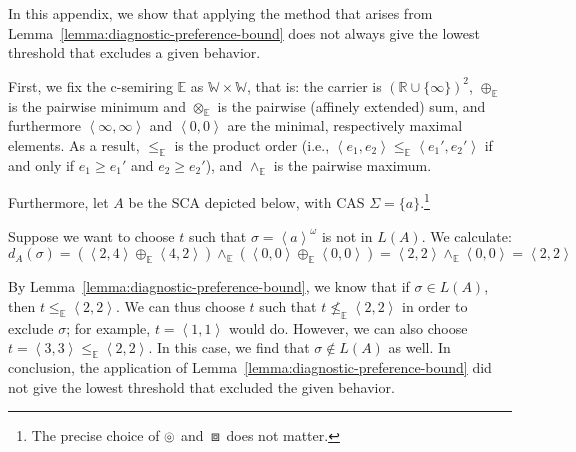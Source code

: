 \documentclass[a4paper]{article}
\newcommand{\angl}[1]{\left\langle#1\right\rangle}
\newcommand{\abscsemiring}{\mathbb{E}}
\newcommand{\wcsemiring}{\mathbb{W}}
\newcommand{\composable}{\mathop{\ocircle}\nolimits}
\newcommand{\compose}{\mathop{\boxbox}\nolimits}
\theoremstyle{definition}
\begin{document}
\begin{appendix}
In this appendix, we show that applying the method that arises from Lemma~\ref{lemma:diagnostic-preference-bound} does not always give the lowest threshold that excludes a given behavior.

First, we fix the c-semiring $\abscsemiring$ as $\wcsemiring \times \wcsemiring$, that is: the carrier is ${(\mathbb{R} \cup \{ \infty \})}^2$, $\oplus_\abscsemiring$ is the pairwise minimum and $\otimes_\abscsemiring$ is the pairwise (affinely extended) sum, and furthermore $\angl{\infty, \infty}$ and $\angl{0, 0}$ are the minimal, respectively maximal elements. As a result, $\leq_\abscsemiring$ is the product order (i.e., $\angl{e_1, e_2} \leq_\abscsemiring \angl{e_1', e_2'}$ if and only if $e_1 \geq e_1'$ and $e_2 \geq e_2'$), and $\wedge_\abscsemiring$ is the pairwise maximum.

Furthermore, let $A$ be the SCA depicted below, with CAS $\Sigma = \{ a \}$.\footnote{The precise choice of $\composable$ and $\compose$ does not matter.}
\begin{figure}
    \centering
\end{figure}

Suppose we want to choose $t$ such that $\sigma = \angl{a}^\omega$ is not in $L(A)$. We calculate:
\[
d_A(\sigma) = (\angl{2, 4} \oplus_\abscsemiring \angl{4, 2}) \wedge_\abscsemiring (\angl{0, 0} \oplus_\abscsemiring \angl{0, 0}) = \angl{2, 2} \wedge_\abscsemiring \angl{0, 0} = \angl{2, 2}
\]

By Lemma~\ref{lemma:diagnostic-preference-bound}, we know that if $\sigma \in L(A)$, then $t \leq_\abscsemiring \angl{2, 2}$. We can thus choose $t$ such that $t \not\leq_\abscsemiring \angl{2, 2}$ in order to exclude $\sigma$; for example, $t = \angl{1,1}$ would do. However, we can also choose $t = \angl{3, 3} \leq_\abscsemiring \angl{2, 2}$. In this case, we find that $\sigma \not\in L(A)$ as well. In conclusion, the application of Lemma~\ref{lemma:diagnostic-preference-bound} did not give the lowest threshold that excluded the given behavior.

\end{appendix}

\fi



\end{document}
